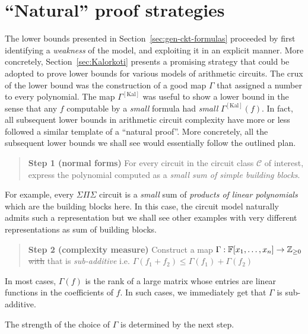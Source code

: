 \documentclass{birkjour}
\newcommand{\CM}[1]{\Gamma^{\mathrm{[#1]}}}
\providecommand{\DIFdeltex}[1]{{\protect\color{red}\sout{#1}}}                      %
\providecommand{\DIFdelbegin}{} %
\providecommand{\DIFdelend}{} %
\providecommand{\DIFdel}[1]{\texorpdfstring{\DIFdeltex{#1}}{}} %
\begin{document}


\section{``Natural'' proof strategies}\label{sec:roadmap}

The lower bounds presented in Section~\ref{sec:gen-ckt-formulas} proceeded by first identifying a \emph{weakness} of the model, and exploiting it in an explicit manner. More concretely, Section~\ref{sec:Kalorkoti} presents a promising strategy that could be adopted to prove lower bounds for various models of arithmetic circuits. The crux of the lower bound was the construction of a good map $\Gamma$ that assigned a number to every polynomial. The map $\CM{Kal}$ was useful to show a lower bound in the sense that any $f$ computable by a \emph{small} formula had \emph{small} $\CM{Kal}(f)$. In fact, all subsequent lower bounds in arithmetic circuit complexity have more or less followed a similar template of a ``natural proof''. More concretely, all the subsequent lower bounds we shall see would essentially follow the outlined plan.  

\begin{quote}
{\bf Step 1 (normal forms)} For every circuit in the circuit class $\mathcal{C}$ of interest, express the polynomial computed as a \emph{small sum of simple building blocks}. 
\end{quote}

For example, every $\Sigma\Pi\Sigma$ circuit is a \emph{small} sum of \emph{products of linear polynomials} which are the building blocks here. In this case, the circuit model naturally admits such a representation but we shall see other examples with very different representations as sum of building blocks. 

\begin{quote}
{\bf Step 2 (complexity measure)} Construct a map $\Gamma: \mathbb{F}[x_1,\dots, x_n] \rightarrow \mathbb{Z}_{\geq 0}$ \DIFdelbegin \DIFdel{with }\DIFdelend that is \emph{sub-additive} i.e. $\Gamma(f_1 + f_2)\leq \Gamma(f_1) + \Gamma(f_2)$
\end{quote}

In most cases, $\Gamma(f)$ is the rank of a large matrix whose entries are linear functions in the coefficients of $f$. In such cases, we immediately get that $\Gamma$ is sub-additive. 

The strength of the choice of $\Gamma$ is determined by the next step. 
\end{document}
